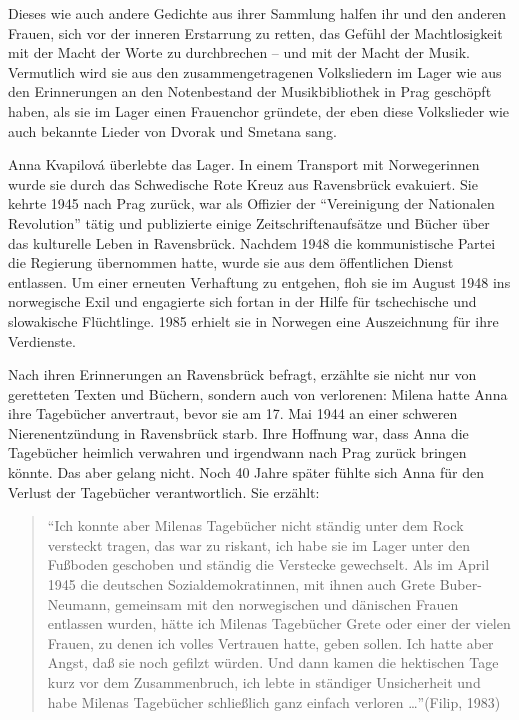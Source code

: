 \documentclass[a4paper,
fontsize=11pt,
oneside,
numbers=noperiodatend,
parskip=half-,
bibliography=totoc,
final
]{scrartcl}
\begin{document}
Dieses wie auch andere Gedichte aus ihrer Sammlung halfen ihr und den
anderen Frauen, sich vor der inneren Erstarrung zu retten, das Gefühl
der Machtlosigkeit mit der Macht der Worte zu durchbrechen -- und mit
der Macht der Musik. Vermutlich wird sie aus den zusammengetragenen
Volksliedern im Lager wie aus den Erinnerungen an den Notenbestand der
Musikbibliothek in Prag geschöpft haben, als sie im Lager einen
Frauenchor gründete, der eben diese Volkslieder wie auch bekannte Lieder
von Dvorak und Smetana sang.

Anna Kvapilová überlebte das Lager. In einem Transport mit Norwegerinnen
wurde sie durch das Schwedische Rote Kreuz aus Ravensbrück evakuiert.
Sie kehrte 1945 nach Prag zurück, war als Offizier der
\enquote{Vereinigung der Nationalen Revolution} tätig und publizierte
einige Zeitschriftenaufsätze und Bücher über das kulturelle Leben in
Ravensbrück. Nachdem 1948 die kommunistische Partei die Regierung
übernommen hatte, wurde sie aus dem öffentlichen Dienst entlassen. Um
einer erneuten Verhaftung zu entgehen, floh sie im August 1948 ins
norwegische Exil und engagierte sich fortan in der Hilfe für
tschechische und slowakische Flüchtlinge. 1985 erhielt sie in Norwegen
eine Auszeichnung für ihre Verdienste.

Nach ihren Erinnerungen an Ravensbrück befragt, erzählte sie nicht nur
von geretteten Texten und Büchern, sondern auch von verlorenen: Milena
hatte Anna ihre Tagebücher anvertraut, bevor sie am 17. Mai 1944 an
einer schweren Nierenentzündung in Ravensbrück starb. Ihre Hoffnung war,
dass Anna die Tagebücher heimlich verwahren und irgendwann nach Prag
zurück bringen könnte. Das aber gelang nicht. Noch 40 Jahre später
fühlte sich Anna für den Verlust der Tagebücher verantwortlich. Sie
erzählt:

\begin{quote}
\enquote{Ich konnte aber Milenas Tagebücher nicht ständig unter dem Rock
versteckt tragen, das war zu riskant, ich habe sie im Lager unter den
Fußboden geschoben und ständig die Verstecke gewechselt. Als im April
1945 die deutschen Sozialdemokratinnen, mit ihnen auch Grete
Buber-Neumann, gemeinsam mit den norwegischen und dänischen Frauen
entlassen wurden, hätte ich Milenas Tagebücher Grete oder einer der
vielen Frauen, zu denen ich volles Vertrauen hatte, geben sollen. Ich
hatte aber Angst, daß sie noch gefilzt würden. Und dann kamen die
hektischen Tage kurz vor dem Zusammenbruch, ich lebte in ständiger
Unsicherheit und habe Milenas Tagebücher schließlich ganz einfach
verloren \ldots{}}(Filip, 1983)
\end{quote}
\end{document}
